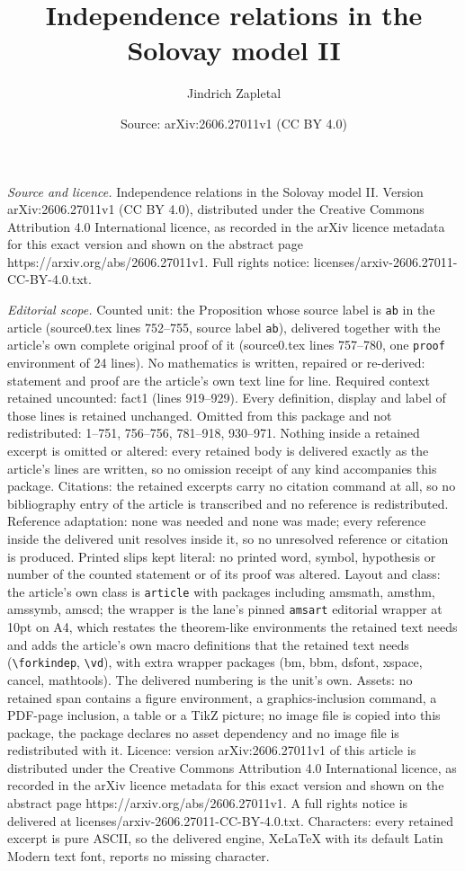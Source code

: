 \documentclass[10pt,a4paper]{amsart}
\title[Independence relations in the Solovay model II]{Independence relations in the Solovay model II}
\author{Jindrich Zapletal}
\date{Source: arXiv:2606.27011v1 (CC BY 4.0)}
\begin{document}
\maketitle

\noindent\emph{Source and licence.} Independence relations in the Solovay model II. Version arXiv:2606.27011v1 (CC BY 4.0), distributed under the Creative Commons Attribution 4.0 International licence, as recorded in the arXiv licence metadata for this exact version and shown on the abstract page https://arxiv.org/abs/2606.27011v1. Full rights notice: licenses/arxiv-2606.27011-CC-BY-4.0.txt.\par\smallskip

\noindent\textit{Editorial scope.} Counted unit: the Proposition whose source label is \texttt{ab} in the article (source0.tex lines 752--755, source label \texttt{ab}), delivered together with the article's own complete original proof of it (source0.tex lines 757--780, one \texttt{proof} environment of 24 lines). No mathematics is written, repaired or re-derived: statement and proof are the article's own text line for line. Required context retained uncounted: fact1 (lines 919--929). Every definition, display and label of those lines is retained unchanged. Omitted from this package and not redistributed: 1--751, 756--756, 781--918, 930--971. Nothing inside a retained excerpt is omitted or altered: every retained body is delivered exactly as the article's lines are written, so no omission receipt of any kind accompanies this package. Citations: the retained excerpts carry no citation command at all, so no bibliography entry of the article is transcribed and no reference is redistributed. Reference adaptation: none was needed and none was made; every reference inside the delivered unit resolves inside it, so no unresolved reference or citation is produced. Printed slips kept literal: no printed word, symbol, hypothesis or number of the counted statement or of its proof was altered. Layout and class: the article's own class is \texttt{article} with packages including amsmath, amsthm, amssymb, amscd; the wrapper is the lane's pinned \texttt{amsart} editorial wrapper at 10pt on A4, which restates the theorem-like environments the retained text needs and adds the article's own macro definitions that the retained text needs (\texttt{\textbackslash forkindep}, \texttt{\textbackslash vd}), with extra wrapper packages (bm, bbm, dsfont, xspace, cancel, mathtools). The delivered numbering is the unit's own. Assets: no retained span contains a figure environment, a graphics-inclusion command, a PDF-page inclusion, a table or a TikZ picture; no image file is copied into this package, the package declares no asset dependency and no image file is redistributed with it. Licence: version arXiv:2606.27011v1 of this article is distributed under the Creative Commons Attribution 4.0 International licence, as recorded in the arXiv licence metadata for this exact version and shown on the abstract page https://arxiv.org/abs/2606.27011v1. A full rights notice is delivered at licenses/arxiv-2606.27011-CC-BY-4.0.txt. Characters: every retained excerpt is pure ASCII, so the delivered engine, XeLaTeX with its default Latin Modern text font, reports no missing character.
\end{document}
